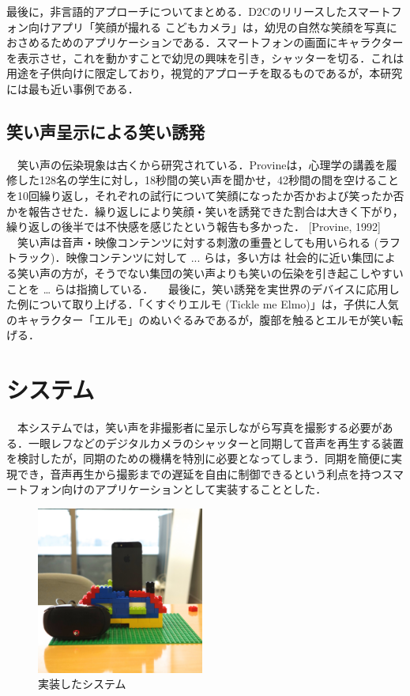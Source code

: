 \documentclass[submit,techreq]{ec2014}
\begin{document}
最後に，非言語的アプローチについてまとめる．D2Cのリリースしたスマートフォン向けアプリ「笑顔が撮れる こどもカメラ」は，幼児の自然な笑顔を写真におさめるためのアプリケーションである．スマートフォンの画面にキャラクターを表示させ，これを動かすことで幼児の興味を引き，シャッターを切る．これは用途を子供向けに限定しており，視覚的アプローチを取るものであるが，本研究には最も近い事例である．


\subsection{笑い声呈示による笑い誘発}
　笑い声の伝染現象は古くから研究されている．Provineは，心理学の講義を履修した128名の学生に対し，18秒間の笑い声を聞かせ，42秒間の間を空けることを10回繰り返し，それぞれの試行について笑顔になったか否かおよび笑ったか否かを報告させた．繰り返しにより笑顔・笑いを誘発できた割合は大きく下がり，繰り返しの後半では不快感を感じたという報告も多かった． [Provine, 1992] 
　笑い声は音声・映像コンテンツに対する刺激の重畳としても用いられる (ラフトラック)．映像コンテンツに対して ... らは，多い方は 社会的に近い集団による笑い声の方が，そうでない集団の笑い声よりも笑いの伝染を引き起こしやすいことを … らは指摘している．
　最後に，笑い誘発を実世界のデバイスに応用した例について取り上げる．「くすぐりエルモ (Tickle me Elmo)」は，子供に人気のキャラクター「エルモ」のぬいぐるみであるが，腹部を触るとエルモが笑い転げる．

\section{システム}

　本システムでは，笑い声を非撮影者に呈示しながら写真を撮影する必要がある．一眼レフなどのデジタルカメラのシャッターと同期して音声を再生する装置を検討したが，同期のための機構を特別に必要となってしまう．同期を簡便に実現でき，音声再生から撮影までの遅延を自由に制御できるという利点を持つスマートフォン向けのアプリケーションとして実装することとした．

\begin{figure}[h!]
  \centering  
\includegraphics[width=55mm, bb=0 0 2404 2404]{images/system.jpg}
\caption{実装したシステム}
  \label{recursive}
\end{figure}
\end{document}
